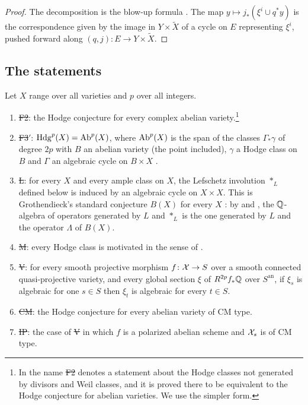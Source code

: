 \begin{proof}
The decomposition is the blow-up formula \cite[Theorem~7.31]{Voi02b}. The
map $y\mapsto j_{*}(\xi^{i}\cup q^{*}y)$ is the correspondence given by the
image in $Y\times\tilde X$ of a cycle on $E$ representing $\xi^{i}$, pushed
forward along $(q,j)\colon E\to Y\times\tilde X$.
\end{proof}

\subsection{The statements}

\begin{definition}\label{def:statements}
Let $X$ range over all varieties and $p$ over all integers.
\begin{enumerate}[label=\textup{(\arabic*)}]
\item \st{F2}: the Hodge conjecture for every complex abelian
variety.\footnote{In \cite{BhH8} the name \st{F2} denotes a statement about
the Hodge classes not generated by divisors and Weil classes, and it is
proved there to be equivalent to the Hodge conjecture for abelian varieties.
We use the simpler form.}
\item \st{F3$'$}: $\operatorname{Hdg}^{p}(X)=\operatorname{Ab}^{p}(X)$, where $\operatorname{Ab}^{p}(X)$ is the span of
the classes $\Gamma_{*}\gamma$ of degree $2p$ with $B$ an abelian variety
(the point included), $\gamma$ a Hodge class on $B$ and $\Gamma$ an
algebraic cycle on $B\times X$ \cite[Definition~20.34]{BhH8}.
\item \st{L}: for every $X$ and every ample class on $X$, the Lefschetz
involution $*_{L}$ defined below is induced by an algebraic cycle on
$X\times X$. This is Grothendieck's standard conjecture $B(X)$ for every $X$
\cite{Gro69}: by \cite[1.4.4]{Kle68} and \cite[Proposition~1.2]{And96}, the
$\mathbb{Q}$-algebra of operators generated by $L$ and $*_{L}$ is the one generated by
$L$ and the operator $\Lambda$ of $B(X)$.
\item \st{M}: every Hodge class is motivated in the sense of
\cite[\S1]{And96}.
\item \st{V}: for every smooth projective morphism $f\colon\mathcal{X}\to S$ over a
smooth connected quasi-projective variety, and every global section $\xi$ of
$R^{2p}f_{*}\mathbb{Q}$ over $S^{\mathrm{an}}$, if $\xi_{s}$ is algebraic for one
$s\in S$ then $\xi_{t}$ is algebraic for every $t\in S$.
\item \st{CM}: the Hodge conjecture for every abelian variety of CM type.
\item \st{IP}: the case of \st{V} in which $f$ is a polarized abelian scheme
and $\mathcal{X}_{s}$ is of CM type.
\end{enumerate}
\end{definition}

